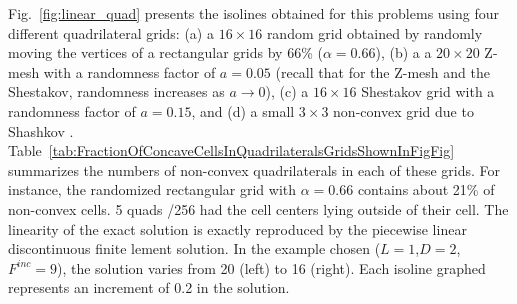 \documentclass[preprint,10pt]{elsarticle}
\newcommand{\fig}[1]{Fig.~\ref{#1}}                      %
\newcommand{\tbl}[1]{Table~\ref{#1}}                     %
\begin{document}
\fig{fig:linear_quad} presents the isolines obtained for this problems using four different quadrilateral grids:
(a) a $16 \times 16$ random grid obtained by randomly moving the vertices of a rectangular grids by 66\% ($\alpha=0.66$), 
(b) a a $20 \times 20$ Z-mesh with a randomness factor of $a=0.05$ (recall that for the Z-mesh and the Shestakov, randomness increases
as $a\to 0$), 
(c) a $16 \times 16$ Shestakov grid  with a randomness factor of $a=0.15$, and 
(d) a small  $3 \times 3$ non-convex grid due to Shashkov \cite{shashkov}.
\tbl{tab:FractionOfConcaveCellsInQuadrilateralsGridsShownInFigFig} summarizes the numbers of non-convex quadrilaterals in each of these grids.  For instance, the randomized rectangular grid with $\alpha=0.66$ contains about 21\% of non-convex cells. 5 quads /256 had the cell centers lying outside of their cell. The linearity of the exact solution is exactly reproduced by the piecewise linear discontinuous finite lement solution. In the example chosen ($L=1$,$D=2$, $F^{inc}=9$), the solution varies from 20 (left) to 16 (right). Each isoline graphed represents an increment of 0.2 in the solution.
\end{document}
